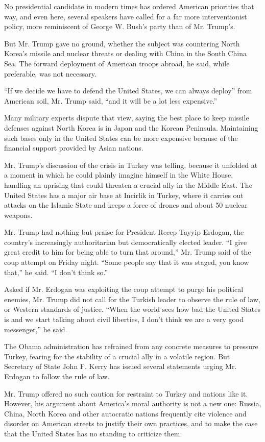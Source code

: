 No presidential candidate in modern times has ordered American
priorities that way, and even here, several speakers have called for a
far more interventionist policy, more reminiscent of George W. Bush's
party than of Mr. Trump's.

But Mr. Trump gave no ground, whether the subject was countering North
Korea's missile and nuclear threats or dealing with China in the South
China Sea. The forward deployment of American troops abroad, he said,
while preferable, was not necessary.

``If we decide we have to defend the United States, we can always
deploy'' from American soil, Mr. Trump said, ``and it will be a lot less
expensive.''

Many military experts dispute that view, saying the best place to keep
missile defenses against North Korea is in Japan and the Korean
Peninsula. Maintaining such bases only in the United States can be more
expensive because of the financial support provided by Asian nations.

Mr. Trump's discussion of the crisis in Turkey was telling, because it
unfolded at a moment in which he could plainly imagine himself in the
White House, handling an uprising that could threaten a crucial ally in
the Middle East. The United States has a major air base at Incirlik in
Turkey, where it carries out attacks on the Islamic State and keeps a
force of drones and about 50 nuclear weapons.

Mr. Trump had nothing but praise for President Recep Tayyip Erdogan, the
country's increasingly authoritarian but democratically elected leader.
``I give great credit to him for being able to turn that around,'' Mr.
Trump said of the coup attempt on Friday night. ``Some people say that
it was staged, you know that,'' he said. ``I don't think so.''

Asked if Mr. Erdogan was exploiting the coup attempt to purge his
political enemies, Mr. Trump did not call for the Turkish leader to
observe the rule of law, or Western standards of justice. ``When the
world sees how bad the United States is and we start talking about civil
liberties, I don't think we are a very good messenger,'' he said.

The Obama administration has refrained from any concrete measures to
pressure Turkey, fearing for the stability of a crucial ally in a
volatile region. But Secretary of State John F. Kerry has issued several
statements urging Mr. Erdogan to follow the rule of law.

Mr. Trump offered no such caution for restraint to Turkey and nations
like it. However, his argument about America's moral authority is not a
new one: Russia, China, North Korea and other autocratic nations
frequently cite violence and disorder on American streets to justify
their own practices, and to make the case that the United States has no
standing to criticize them.


